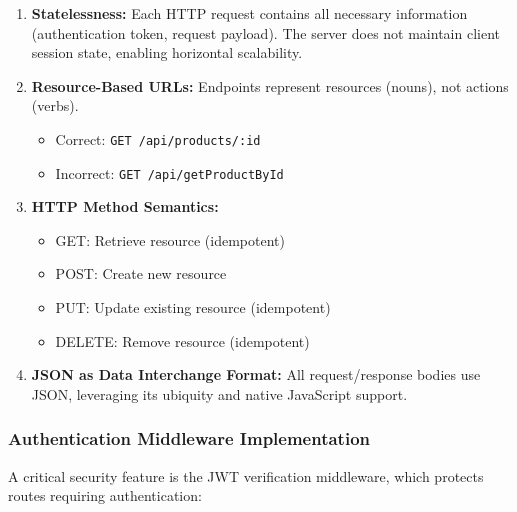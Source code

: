 \documentclass[12pt, a4paper]{report}
\begin{document}
\begin{enumerate}
    \item \textbf{Statelessness:} Each HTTP request contains all necessary information (authentication token, request payload). The server does not maintain client session state, enabling horizontal scalability.
    
    \item \textbf{Resource-Based URLs:} Endpoints represent resources (nouns), not actions (verbs).
    \begin{itemize}
        \item Correct: \texttt{GET /api/products/:id}
        \item Incorrect: \texttt{GET /api/getProductById}
    \end{itemize}
    
    \item \textbf{HTTP Method Semantics:}
    \begin{itemize}
        \item GET: Retrieve resource (idempotent)
        \item POST: Create new resource
        \item PUT: Update existing resource (idempotent)
        \item DELETE: Remove resource (idempotent)
    \end{itemize}
    
    \item \textbf{JSON as Data Interchange Format:} All request/response bodies use JSON, leveraging its ubiquity and native JavaScript support.
\end{enumerate}

\subsubsection{Authentication Middleware Implementation}

A critical security feature is the JWT verification middleware, which protects routes requiring authentication:
\end{document}
